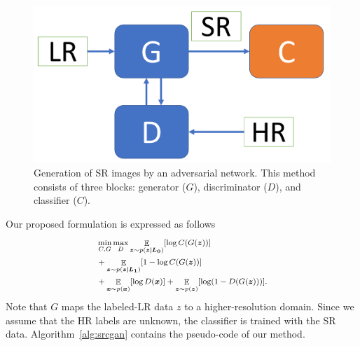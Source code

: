 \documentclass[10pt,twocolumn,letterpaper]{article}
\DeclareMathOperator*{\E}{\mathbb{E}}
\providecommand{\ve}[1]{{\bm{#1}}} %
\begin{document}
\begin{figure}[h]
\begin{center}
\includegraphics[scale=0.25]{cgan.pdf}
\end{center}
   \caption{Generation of SR images by an adversarial network. This method consists of three blocks: generator ($G$), discriminator ($D$), and classifier ($C$).}
\label{fig:cgan}
\end{figure}

Our proposed formulation is expressed as follows
\begin{eqnarray}
\label{eq:srcgan}
\footnotesize
\begin{aligned}
& \min_{C,G} \max_D \E_{\ve{z} \sim p(\ve{z|L_0})}[\log C(G(\ve{z}))] \\ & +  \E_{\ve{z} \sim p(\ve{z|L_1})}[1-\log C(G(\ve{z}))] \\ & + \E_{\ve{x} \sim p(\ve{x})}[\log D(\ve{x})] + \E_{\ve{z} \sim p(\ve{z})}[\log (1 - D(G(\ve{z})))].
\end{aligned}
\end{eqnarray}
Note that $G$ maps the labeled-LR data $z$ to a higher-resolution domain. Since we assume that the HR labels are unknown, the classifier is trained with the SR data. Algorithm~\ref{alg:srcgan} contains the pseudo-code of our method.
\end{document}
